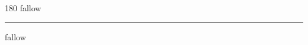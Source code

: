 
\begin{frame}
\begin{center}
\begin{turn}{180}
{\fontsize{2.5cm}{1em}\selectfont fallow}
\end{turn}
\vspace{1em}\par  
\hrule
\vspace{1em}\par  
{\fontsize{2.5cm}{1em}\selectfont fallow}
\end{center}
\end{frame}
